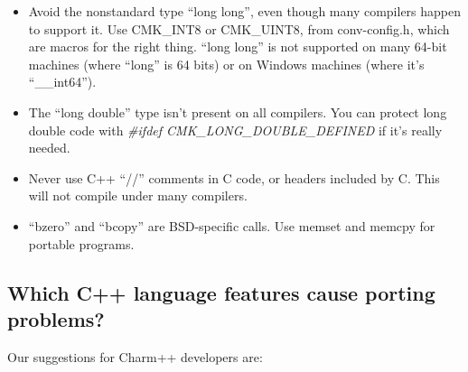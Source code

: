 \begin{itemize}
\item Avoid the nonstandard type ``long long'', even though many compilers
happen to support it.  Use CMK\_INT8 or CMK\_UINT8,
from conv-config.h, which are macros for the right thing.
``long long'' is not supported on many 64-bit machines (where ``long''
is 64 bits) or on Windows machines (where it's ``\_\_int64'').
\item The ``long double'' type isn't present on all compilers.  You can protect
long double code with {\em \#ifdef CMK\_LONG\_DOUBLE\_DEFINED} if it's really needed.
\item Never use C++ ``//'' comments in C code, or headers included by C.
This will not compile under many compilers. %
\item ``bzero'' and ``bcopy'' are BSD-specific calls.  
Use memset and memcpy for portable programs.
\end{itemize}

\subsection{Which C++ language features cause porting problems?}

Our suggestions for Charm++ developers are:

